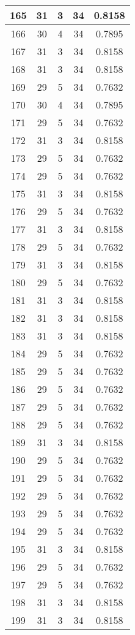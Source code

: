 \documentclass[letterpaper, 12pt]{article}
\begin{document}
\begin{longtable}{|c|c|c|c|c|}
\hline
165 & 31 & 3 & 34 & 0.8158 \\
\hline
166 & 30 & 4 & 34 & 0.7895 \\
\hline
167 & 31 & 3 & 34 & 0.8158 \\
\hline
168 & 31 & 3 & 34 & 0.8158 \\
\hline
169 & 29 & 5 & 34 & 0.7632 \\
\hline
170 & 30 & 4 & 34 & 0.7895 \\
\hline
171 & 29 & 5 & 34 & 0.7632 \\
\hline
172 & 31 & 3 & 34 & 0.8158 \\
\hline
173 & 29 & 5 & 34 & 0.7632 \\
\hline
174 & 29 & 5 & 34 & 0.7632 \\
\hline
175 & 31 & 3 & 34 & 0.8158 \\
\hline
176 & 29 & 5 & 34 & 0.7632 \\
\hline
177 & 31 & 3 & 34 & 0.8158 \\
\hline
178 & 29 & 5 & 34 & 0.7632 \\
\hline
179 & 31 & 3 & 34 & 0.8158 \\
\hline
180 & 29 & 5 & 34 & 0.7632 \\
\hline
181 & 31 & 3 & 34 & 0.8158 \\
\hline
182 & 31 & 3 & 34 & 0.8158 \\
\hline
183 & 31 & 3 & 34 & 0.8158 \\
\hline
184 & 29 & 5 & 34 & 0.7632 \\
\hline
185 & 29 & 5 & 34 & 0.7632 \\
\hline
186 & 29 & 5 & 34 & 0.7632 \\
\hline
187 & 29 & 5 & 34 & 0.7632 \\
\hline
188 & 29 & 5 & 34 & 0.7632 \\
\hline
189 & 31 & 3 & 34 & 0.8158 \\
\hline
190 & 29 & 5 & 34 & 0.7632 \\
\hline
191 & 29 & 5 & 34 & 0.7632 \\
\hline
192 & 29 & 5 & 34 & 0.7632 \\
\hline
193 & 29 & 5 & 34 & 0.7632 \\
\hline
194 & 29 & 5 & 34 & 0.7632 \\
\hline
195 & 31 & 3 & 34 & 0.8158 \\
\hline
196 & 29 & 5 & 34 & 0.7632 \\
\hline
197 & 29 & 5 & 34 & 0.7632 \\
\hline
198 & 31 & 3 & 34 & 0.8158 \\
\hline
199 & 31 & 3 & 34 & 0.8158 \\
\hline
\end{longtable}
\end{document}
